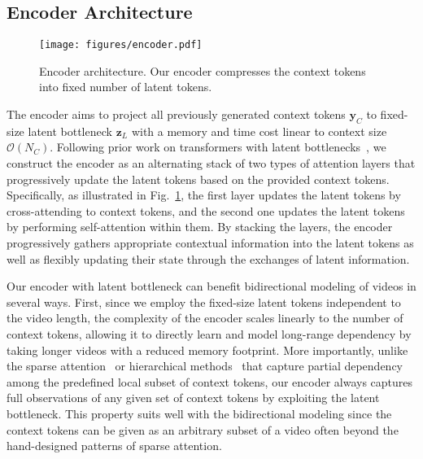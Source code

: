 \documentclass[10pt,twocolumn,letterpaper]{article}
\begin{document}
\subsection{Encoder Architecture}
\label{sec:mebt_encoder}
\begin{figure}[!th]
    \centering
    \texttt{[image: figures/encoder.pdf]}
    \vspace{-0.3cm}
    \caption{Encoder architecture. Our encoder compresses the context tokens into fixed number of latent tokens.}
    \label{fig:encoder}
    \vspace{-0.5cm}
\end{figure}
The encoder aims to project all previously generated context tokens $\mathbf{y}_C$ to fixed-size latent bottleneck $\mathbf{z}_L$ with a memory and time cost linear to context size $\mathcal{O}(N_C)$.
Following prior work on transformers with latent bottlenecks~\cite{Perceiver, PerceiverIO, SetTransformer, LUNA, SetVAE}, we construct the encoder as an alternating stack of two types of attention layers that progressively update the latent tokens based on the provided context tokens.
Specifically, as illustrated in Fig.~\ref{fig:encoder}, the first layer updates the latent tokens by cross-attending to context tokens, and the second one updates the latent tokens by performing self-attention within them.
By stacking the layers, the encoder progressively gathers appropriate contextual information into the latent tokens as well as flexibly updating their state through the exchanges of latent information.





Our encoder with latent bottleneck can benefit bidirectional modeling of videos in several ways.
First, since we employ the fixed-size latent tokens independent to the video length, the complexity of the encoder scales linearly to the number of context tokens, allowing it to directly learn and model long-range dependency by taking longer videos with a reduced memory footprint.
More importantly, unlike the sparse attention~\cite{Ho2019, MaskViT} or hierarchical methods~\cite{CogVideo, TATS} that capture partial dependency among the predefined local subset of context tokens, our encoder always captures full observations of any given set of context tokens by exploiting the latent bottleneck.
This property suits well with the bidirectional modeling since the context tokens can be given as an arbitrary subset of a video often beyond the hand-designed patterns of sparse attention. 
\end{document}
